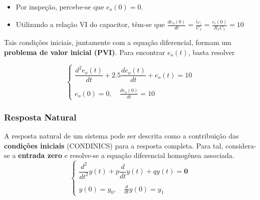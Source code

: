 \documentclass{article}
\numberwithin{equation}{section}
\begin{document}
\begin{center}
\end{center}

\begin{itemize}
    \item Por inspeção, percebe-se que $e_{o}(0) = 0$.
    \item Utilizando a relação VI do capacitor, têm-se que $\displaystyle{\frac{ de_{o}(0) }{ dt }= \frac{ i_{ C{_1} } } { C_{1} } } = \frac{ e_{i}(0) }{ R_{1}C_{1} } = 10$
\end{itemize}

Tais condições iniciais, juntamente com a equação diferencial, formam um \textbf{problema de valor inicial (PVI)}. Para encontrar $e_{o}(t)$, basta resolver

\begin{equation}
    \begin{cases}
        \dfrac{ d^2e_{o}(t) }{ dt }+ 2.5 \dfrac{ de_{o}(t) }{ dt } + e_{o}(t) = 10\\ \\
        \displaystyle e_{o}(0) = 0, \quad \frac{de_o(0)}{dt}=10
    \end{cases}
\end{equation}

\subsubsection{Resposta Natural}
\label{subsubsec:natural}
A resposta natural de um sistema pode ser descrita como a contribuição das \textbf{condições iniciais} (CONDINICS) para a resposta completa. Para tal, considera-se a \textbf{entrada zero} e resolve-se a equação diferencial homogênea associada.
\begin{equation*}
    \begin{cases}
        \dfrac{d^2}{dt^2}y(t)+p\dfrac{d}{dt}y(t)+qy(t)=\textbf{0}\\ \\
        \displaystyle{y(0)=y_{0}, \quad \frac{d}{dt}y(0)=y_{1}}
    \end{cases}
\end{equation*}
\end{document}
